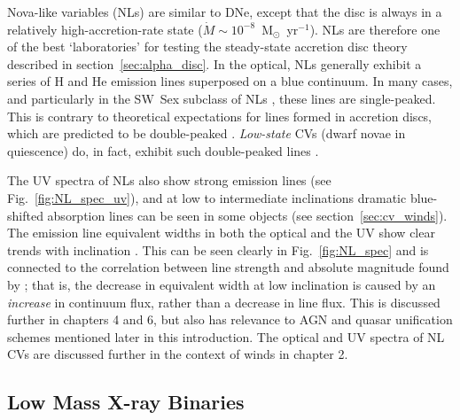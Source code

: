 Nova-like variables (NLs) are similar to DNe, 
except that the disc is always in a relatively 
high-accretion-rate state ($\dot{M} \sim 10^{-8}$~M$_{\odot}$~yr$^{-1}$).
NLs are therefore one of the best `laboratories' for testing the steady-state
accretion disc theory described in section~\ref{sec:alpha_disc}.
In the optical, NLs generally exhibit a series of H and He emission 
lines superposed on a blue continuum. In many
cases, and particularly in the SW~Sex subclass of NLs 
\citep{HSK86,DR95}, these lines are single-peaked. This is contrary to
theoretical expectations for lines formed in accretion discs, which
are predicted to be double-peaked \citep{smak1981, hornemarsh1986}. 
{\em Low-state} CVs (dwarf novae in quiescence) do, in fact,
exhibit such double-peaked lines \citep{marshhorne1990}. 

\nocite{dhillon1996,hessman1984}


The UV spectra of NLs also show strong emission lines (see Fig.~\ref{fig:NL_spec_uv}), and at 
low to intermediate inclinations dramatic blue-shifted absorption lines
can be seen in some objects (see section~\ref{sec:cv_winds}). The emission line equivalent widths
in both the optical and the UV show clear trends with 
inclination \citep{hessman1984,echevarria1988,noebauer}. 
This can be seen clearly in Fig.~\ref{fig:NL_spec} and is connected to
the correlation between line strength and absolute magnitude 
found by \cite{patterson1984};
that is, the decrease in equivalent width at low inclination is caused by an {\em increase} in continuum flux, rather than a decrease in line flux. 
This is discussed further in chapters 4 and 6, but also has 
relevance to AGN and quasar unification schemes mentioned later in this introduction.
The optical and UV spectra of NL CVs are discussed further
in the context of winds in chapter 2.

\subsection{Low Mass X-ray Binaries}

